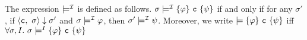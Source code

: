 


\begin{definition}
    The expression $\models^{\mathcal{I}}$ is defined as follows.
    $\sigma \models^{\mathcal{I}} \{ \varphi \} ~\mathtt{c}~ \{ \psi \}$
    if and only if for any $\sigma'$, 
    if $\langle \mathtt{c},~\sigma \rangle \downarrow \sigma'$
    and $\sigma \models^{\mathcal{I}} \varphi$, 
    then $\sigma' \models^{\mathcal{I}} \psi$.
    Moreover, we write $\models \{ \varphi \} ~\mathtt{c}~ \{ \psi \}$ iff 
    $\forall \sigma, I.~ 
      \sigma \models^I \{ \varphi \} ~\mathtt{c}~ \{ \psi \}$
\end{definition}


